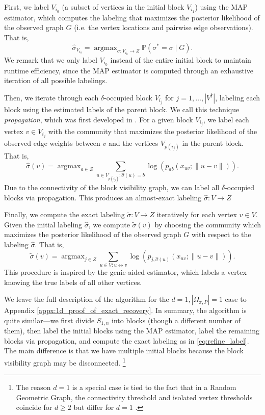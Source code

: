 \documentclass{article}
\DeclareMathOperator*{\argmax}{argmax}
\renewcommand{\P}{\mathbb{P}}
\newcommand{\1}{\mathbbm{1}}
\newcommand{\visible}{\leftrightarrow{}}
\theoremstyle{definition}
\theoremstyle{plain}
\begin{document}
First, we label $V_{i_0}$ (a subset of vertices in the initial block $V_{i_1}$) using the MAP estimator, which computes the labeling that maximizes the posterior likelihood of the observed graph $G$ (i.e. the vertex locations and pairwise edge observations). That is,
\begin{equation}
\label{eq:MAP}
    \hat{\sigma}_{V_{i_0}} = \argmax_{\sigma:V_{i_0} \to Z} \P(\sigma^* = \sigma \mid G).
\end{equation}
We remark that we only label $V_{i_0}$ instead of the entire initial block to maintain runtime efficiency, since the MAP estimator is computed through an exhaustive iteration of all possible labelings. 

Then, we iterate through each $\delta$-occupied block $V_{i_j}$ for $j = 1, \ldots, |V^\dagger|$, labeling each block using the estimated labels of the parent block. We call this technique \textit{propagation}, which was first developed in \cite{Gaudio+2024}. For a given block $V_{i_j}$, we label each vertex $v \in V_{i_j}$ with the community that maximizes the posterior likelihood of the observed edge weights between $v$ and the vertices $V_{p(i_j)}$ in the parent block. That is,
\begin{equation}
\label{eq:propagate}
    \hat{\sigma}(v) = \argmax_{a \in Z} \sum_{u \in V_{p(i_j)}: \hat{\sigma}(u) = b} \log(p_{ab}(x_{uv}; \|u - v\|)).
\end{equation}
Due to the connectivity of the block visibility graph, we can label all $\delta$-occupied blocks via propagation. This produces an almost-exact labeling $\hat{\sigma}: V \to Z$ 
 
Finally, we compute the exact labeling $\tilde{\sigma}: V \to Z$ iteratively for each vertex $v \in V$. Given the initial labeling $\hat{\sigma}$, we compute $\tilde{\sigma}(v)$ by choosing the community which maximizes the posterior likelihood of the observed graph $G$ with respect to the labeling $\hat{\sigma}$. That is,
\begin{equation}
\label{eq:refine_label}
    \tilde{\sigma}(v) = \argmax_{j \in Z} \sum_{u \in V: u \visible v} \log( p_{j, \hat{\sigma}(u)}(x_{uv}; \|u - v\|) ).
\end{equation}
This procedure is inspired by the genie-aided estimator, which labels a vertex knowing the true labels of all other vertices.

We leave the full description of the algorithm for the $d = 1, |\Omega_{\pi, P}| = 1$ case to Appendix \ref{appx:1d_proof_of_exact_recovery}. In summary, the algorithm is quite similar---we first divide $S_{1, n}$ into blocks (though a different number of them), then label the initial blocks using the MAP estimator, label the remaining blocks via propagation, and compute the exact labeling as in \eqref{eq:refine_label}. The main difference is that we have multiple initial blocks because the block visibility graph may be disconnected. \footnote{The reason $d=1$ is a special case is tied to the fact that in a Random Geometric Graph, the connectivity threshold and isolated vertex thresholds coincide for $d \geq 2$ but differ for $d =1$ \cite{Penrose2003} \cite{Zhao2015}.}
\end{document}

